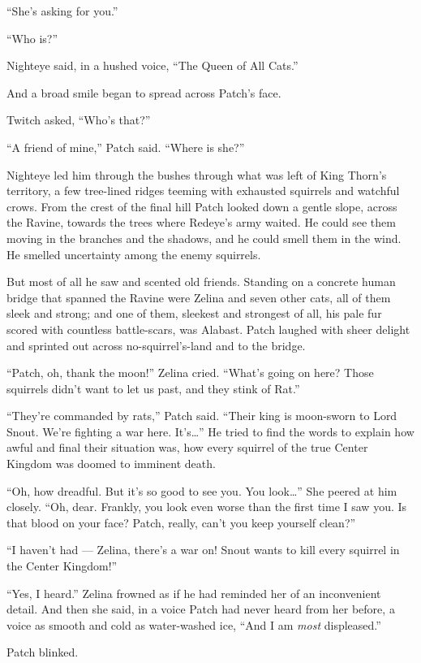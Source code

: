 \documentclass[12pt]{memoir}
\begin{document}
“She’s asking for you.”

“Who is?”

Nighteye said, in a hushed voice, “The Queen of All Cats.”

And a broad smile began to spread across Patch’s face.

Twitch asked, “Who’s that?”

“A friend of mine,” Patch said. “Where is she?”

Nighteye led him through the bushes through what was left of King
Thorn’s territory, a few tree-lined ridges teeming with exhausted
squirrels and watchful crows. From the crest of the final hill Patch
looked down a gentle slope, across the Ravine, towards the trees where
Redeye’s army waited. He could see them moving in the branches and the
shadows, and he could smell them in the wind. He smelled uncertainty
among the enemy squirrels.

But most of all he saw and scented old friends. Standing on a concrete
human bridge that spanned the Ravine were Zelina and seven other cats,
all of them sleek and strong; and one of them, sleekest and strongest
of all, his pale fur scored with countless battle-scars, was
Alabast. Patch laughed with sheer delight and sprinted out across
no-squirrel’s-land and to the bridge.

“Patch, oh, thank the moon!” Zelina cried. “What’s going on here?
Those squirrels didn’t want to let us past, and they stink of Rat.”

“They’re commanded by rats,” Patch said. “Their king is moon-sworn to
Lord Snout. We’re fighting a war here. It’s…” He tried to find the
words to explain how awful and final their situation was, how every
squirrel of the true Center Kingdom was doomed to imminent death.

“Oh, how dreadful. But it’s so good to see you. You look…” She peered
at him closely. “Oh, dear. Frankly, you look even worse than the first
time I saw you. Is that blood on your face? Patch, really, can’t you
keep yourself clean?”

“I haven’t had — Zelina, there’s a war on! Snout wants to kill every
squirrel in the Center Kingdom!”

“Yes, I heard.” Zelina frowned as if he had reminded her of an
inconvenient detail. And then she said, in a voice Patch had never
heard from her before, a voice as smooth and cold as water-washed ice,
“And I am \textit{most} displeased.”

Patch blinked.
\end{document}
